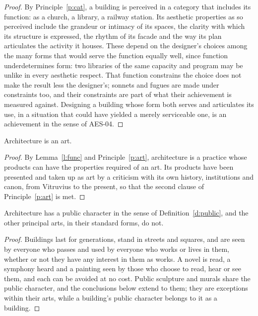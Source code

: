 \documentclass{situationist-preprint}
\begin{document}
\begin{proof}
By Principle~\ref{p:cat}, a building is perceived in a category that includes its function: as a church, a library, a railway station. Its aesthetic properties as so perceived include the grandeur or intimacy of its spaces, the clarity with which its structure is expressed, the rhythm of its facade and the way its plan articulates the activity it houses. These depend on the designer's choices among the many forms that would serve the function equally well, since function underdetermines form: two libraries of the same capacity and program may be unlike in every aesthetic respect. That function constrains the choice does not make the result less the designer's; sonnets and fugues are made under constraints too, and their constraints are part of what their achievement is measured against. Designing a building whose form both serves and articulates its use, in a situation that could have yielded a merely serviceable one, is an achievement in the sense of AES-04.
\end{proof}

\begin{theorem}\label{t:art}
Architecture is an art.
\end{theorem}

\begin{proof}
By Lemma~\ref{l:func} and Principle~\ref{p:art}, architecture is a practice whose products can have the properties required of an art. Its products have been presented and taken up as art by a criticism with its own history, institutions and canon, from Vitruvius to the present, so that the second clause of Principle~\ref{p:art} is met.
\end{proof}

\begin{lemma}\label{l:pub}
Architecture has a public character in the sense of Definition~\ref{d:public}, and the other principal arts, in their standard forms, do not.
\end{lemma}

\begin{proof}
Buildings last for generations, stand in streets and squares, and are seen by everyone who passes and used by everyone who works or lives in them, whether or not they have any interest in them as works. A novel is read, a symphony heard and a painting seen by those who choose to read, hear or see them, and each can be avoided at no cost. Public sculpture and murals share the public character, and the conclusions below extend to them; they are exceptions within their arts, while a building's public character belongs to it as a building.
\end{proof}
\end{document}
